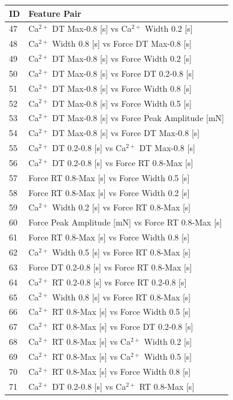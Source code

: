 \documentclass{report}
\begin{document}
\hspace{1em} %
\begin{tabular}{@{}ll@{}}
\toprule
\textbf{ID} & \textbf{Feature Pair} \\
\midrule
47 & Ca$^{2+}$ DT Max-0.8 [s] vs Ca$^{2+}$ Width 0.2 [s] \\
48 & Ca$^{2+}$ Width 0.8 [s] vs Force DT Max-0.8 [s] \\
49 & Ca$^{2+}$ DT Max-0.8 [s] vs Force Width 0.2 [s] \\
50 & Ca$^{2+}$ DT Max-0.8 [s] vs Force DT 0.2-0.8 [s] \\
51 & Ca$^{2+}$ DT Max-0.8 [s] vs Force Width 0.8 [s] \\
52 & Ca$^{2+}$ DT Max-0.8 [s] vs Force Width 0.5 [s] \\
53 & Ca$^{2+}$ DT Max-0.8 [s] vs Force Peak Amplitude [mN] \\
54 & Ca$^{2+}$ DT Max-0.8 [s] vs Force DT Max-0.8 [s] \\
55 & Ca$^{2+}$ DT 0.2-0.8 [s] vs Ca$^{2+}$ DT Max-0.8 [s] \\
56 & Ca$^{2+}$ DT 0.2-0.8 [s] vs Force RT 0.8-Max [s] \\
57 & Force RT 0.8-Max [s] vs Force Width 0.5 [s] \\
58 & Force RT 0.8-Max [s] vs Force Width 0.2 [s] \\
59 & Ca$^{2+}$ Width 0.2 [s] vs Force RT 0.8-Max [s] \\
60 & Force Peak Amplitude [mN] vs Force RT 0.8-Max [s] \\
61 & Force RT 0.8-Max [s] vs Force Width 0.8 [s] \\
62 & Ca$^{2+}$ Width 0.5 [s] vs Force RT 0.8-Max [s] \\
63 & Force DT 0.2-0.8 [s] vs Force RT 0.8-Max [s] \\
64 & Ca$^{2+}$ RT 0.2-0.8 [s] vs Force RT 0.2-0.8 [s] \\
65 & Ca$^{2+}$ Width 0.8 [s] vs Force RT 0.8-Max [s] \\
66 & Ca$^{2+}$ RT 0.8-Max [s] vs Force Width 0.5 [s] \\
67 & Ca$^{2+}$ RT 0.8-Max [s] vs Force DT 0.2-0.8 [s] \\
68 & Ca$^{2+}$ RT 0.8-Max [s] vs Ca$^{2+}$ Width 0.2 [s] \\
69 & Ca$^{2+}$ RT 0.8-Max [s] vs Ca$^{2+}$ Width 0.5 [s] \\
70 & Ca$^{2+}$ RT 0.8-Max [s] vs Force Width 0.8 [s] \\
71 & Ca$^{2+}$ DT 0.2-0.8 [s] vs Ca$^{2+}$ RT 0.8-Max [s] \\

\end{tabular}
\end{document}
